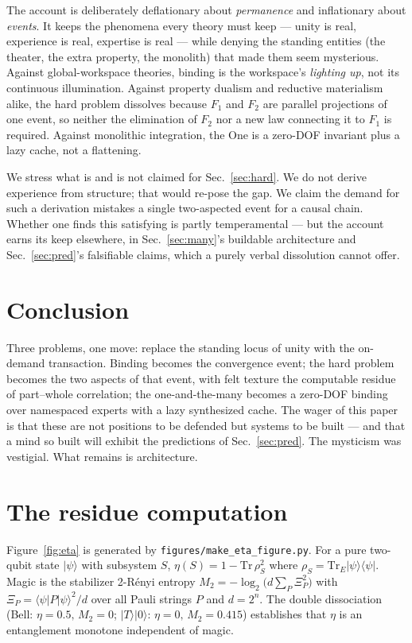 \documentclass[11pt]{article}
\begin{document}
The account is deliberately deflationary about \emph{permanence} and inflationary about \emph{events}.
It keeps the phenomena every theory must keep --- unity is real, experience is real, expertise is real
--- while denying the standing entities (the theater, the extra property, the monolith) that made them
seem mysterious. Against global-workspace theories, binding is the workspace's \emph{lighting up}, not
its continuous illumination. Against property dualism and reductive materialism alike, the hard problem
dissolves because $F_1$ and $F_2$ are parallel projections of one event, so neither the elimination of
$F_2$ nor a new law connecting it to $F_1$ is required. Against monolithic integration, the One is a
zero-DOF invariant plus a lazy cache, not a flattening.

We stress what is and is not claimed for Sec.~\ref{sec:hard}. We do not derive experience from
structure; that would re-pose the gap. We claim the demand for such a derivation mistakes a single
two-aspected event for a causal chain. Whether one finds this satisfying is partly temperamental --- but
the account earns its keep elsewhere, in Sec.~\ref{sec:many}'s buildable architecture and
Sec.~\ref{sec:pred}'s falsifiable claims, which a purely verbal dissolution cannot offer.

\section{Conclusion}

Three problems, one move: replace the standing locus of unity with the on-demand transaction. Binding
becomes the convergence event; the hard problem becomes the two aspects of that event, with felt texture
the computable residue of part--whole correlation; the one-and-the-many becomes a zero-DOF binding over
namespaced experts with a lazy synthesized cache. The wager of this paper is that these are not
positions to be defended but systems to be built --- and that a mind so built will exhibit the
predictions of Sec.~\ref{sec:pred}. The mysticism was vestigial. What remains is architecture.

\appendix
\section{The residue computation}
Figure~\ref{fig:eta} is generated by \texttt{figures/make\_eta\_figure.py}. For a pure two-qubit state
$|\psi\rangle$ with subsystem $S$, $\eta(S)=1-\mathrm{Tr}\,\rho_S^2$ where $\rho_S=\mathrm{Tr}_E
|\psi\rangle\langle\psi|$. Magic is the stabilizer 2-R\'enyi entropy $M_2=-\log_2\!\big(d\sum_P
\Xi_P^2\big)$ with $\Xi_P=\langle\psi|P|\psi\rangle^2/d$ over all Pauli strings $P$ and $d=2^n$. The
double dissociation (Bell: $\eta=0.5,\,M_2=0$; $|T\rangle|0\rangle$: $\eta=0,\,M_2=0.415$) establishes
that $\eta$ is an entanglement monotone independent of magic.
\end{document}
